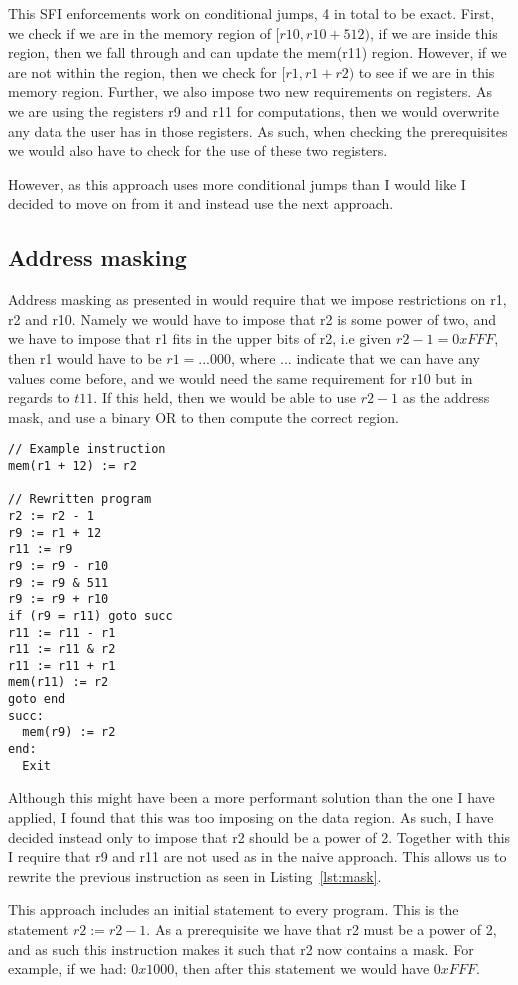 This SFI enforcements work on conditional jumps, 4 in total to be exact. First,
we check if we are in the memory region of $[r10, r10 + 512)$, if we are inside
this region, then we fall through and can update the mem(r11) region. However,
if we are not within the region, then we check for $[r1, r1+r2)$ to see if we
are in this memory region. Further, we also impose two new requirements on
registers. As we are using the registers r9 and r11 for computations, then we
would overwrite any data the user has in those registers. As such, when
checking the prerequisites we would also have to check for the use of these two
registers.

However, as this approach uses more conditional jumps than I would like I
decided to move on from it and instead use the next approach.

\subsection{Address masking}
Address masking as presented in \cite{SFI} would require that we impose
restrictions on r1, r2 and r10. Namely we would have to impose that r2 is some
power of two, and we have to impose that r1 fits in the upper bits of r2, i.e
given $r2 - 1 = 0xFFF$, then r1 would have to be $r1=...000$, where ...
indicate that we can have any values come before, and we would need the same
requirement for r10 but in regards to $t11$. If this held, then we would be
able to use $r2-1$ as the address mask, and use a binary OR to then compute the
correct region.

\begin{lstlisting}[caption={Example program}, label={lst:mask}, mathescape=true]
// Example instruction
mem(r1 + 12) := r2

// Rewritten program
r2 := r2 - 1
r9 := r1 + 12
r11 := r9
r9 := r9 - r10
r9 := r9 & 511
r9 := r9 + r10
if (r9 = r11) goto succ
r11 := r11 - r1
r11 := r11 & r2
r11 := r11 + r1
mem(r11) := r2
goto end
succ:
  mem(r9) := r2
end:
  Exit
\end{lstlisting}

Although this might have been a more performant solution than the one I have
applied, I found that this was too imposing on the data region. As such, I have
decided instead only to impose that r2 should be a power of 2. Together with
this I require that r9 and r11 are not used as in the naive approach. This
allows us to rewrite the previous instruction as seen in Listing~\ref{lst:mask}.

This approach includes an initial statement to every program. This is the
statement $r2 := r2 - 1$. As a prerequisite we have that r2 must be a power of
2, and as such this instruction makes it such that r2 now contains a mask. For
example, if we had: $0x1000$, then after this statement we would have $0xFFF$.

